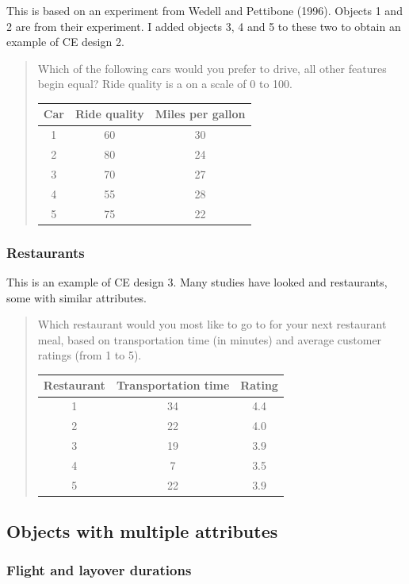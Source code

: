\documentclass[11pt,letter]{amsart}
\begin{document}
This is based on an experiment from Wedell and Pettibone (1996). Objects 1
and 2 are from their experiment. I added objects 3, 4 and 5 to these two to
obtain an example of CE design 2.

\begin{quotation}
Which of the following cars would you prefer to drive, all other features
begin equal? Ride quality is a on a scale of 0 to 100.

\begin{tabular}{ccc}
\hline
Car & Ride quality & Miles per gallon \\ \hline
1 & 60 & 30 \\ 
2 & 80 & 24 \\ 
3 & 70 & 27 \\ 
4 & 55 & 28 \\ 
5 & 75 & 22 \\ \hline
\end{tabular}
\end{quotation}

\subsubsection{Restaurants}

This is an example of CE design 3. Many studies have looked and restaurants,
some with similar attributes.

\begin{quotation}
Which restaurant would you most like to go to for your next restaurant meal,
based on transportation time (in minutes) and average customer ratings (from
1 to 5).

\begin{tabular}{ccc}
\hline
Restaurant & Transportation time & Rating \\ \hline
1 & 34 & 4.4 \\ 
2 & 22 & 4.0 \\ 
3 & 19 & 3.9 \\ 
4 & 7 & 3.5 \\ 
5 & 22 & 3.9 \\ \hline
\end{tabular}
\end{quotation}

\subsection{Objects with multiple attributes}

\subsubsection{Flight and layover durations}
\end{document}

